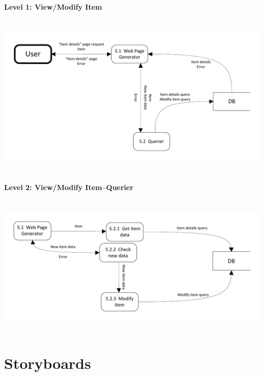 \documentclass{article}
\begin{document}
\paragraph{Level 1: View/Modify Item}
~\\
\includegraphics[keepaspectratio, width=6.5in]{dfd_level1_view_modify_item.pdf}\\
~\\

\paragraph{Level 2: View/Modify Item--Querier}
~\\
\includegraphics[keepaspectratio, width=6.5in]{dfd_level2_view_modify_item_querier.pdf}\\
~\\

\section{Storyboards}
\graphicspath{{../StoryboardImages/}}
\end{document}
